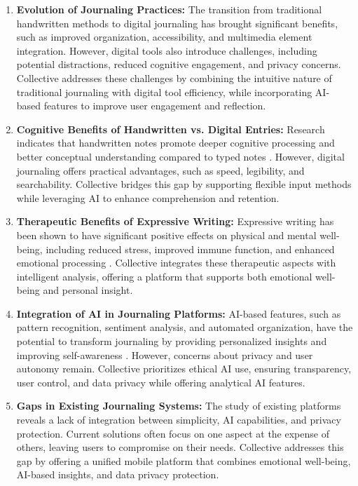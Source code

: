 \begin{enumerate}
	\item \textbf{Evolution of Journaling Practices:} The transition from traditional handwritten methods to digital journaling has brought significant benefits, such as improved organization, accessibility, and multimedia element integration. However, digital tools also introduce challenges, including potential distractions, reduced cognitive engagement, and privacy concerns. Collective addresses these challenges by combining the intuitive nature of traditional journaling with digital tool efficiency, while incorporating AI-based features to improve user engagement and reflection.
	
	\item \textbf{Cognitive Benefits of Handwritten vs. Digital Entries:} Research indicates that handwritten notes promote deeper cognitive processing and better conceptual understanding compared to typed notes \cite{mueller2014pen}. However, digital journaling offers practical advantages, such as speed, legibility, and searchability. Collective bridges this gap by supporting flexible input methods while leveraging AI to enhance comprehension and retention.
	
	\item \textbf{Therapeutic Benefits of Expressive Writing:} Expressive writing has been shown to have significant positive effects on physical and mental well-being, including reduced stress, improved immune function, and enhanced emotional processing \cite{pennebaker1999forming}. Collective integrates these therapeutic aspects with intelligent analysis, offering a platform that supports both emotional well-being and personal insight.
	
	\item \textbf{Integration of AI in Journaling Platforms:} AI-based features, such as pattern recognition, sentiment analysis, and automated organization, have the potential to transform journaling by providing personalized insights and improving self-awareness \cite{allahyari2017text}. However, concerns about privacy and user autonomy remain. Collective prioritizes ethical AI use, ensuring transparency, user control, and data privacy while offering analytical AI features.
	
	\item \textbf{Gaps in Existing Journaling Systems:} The study of existing platforms reveals a lack of integration between simplicity, AI capabilities, and privacy protection. Current solutions often focus on one aspect at the expense of others, leaving users to compromise on their needs. Collective addresses this gap by offering a unified mobile platform that combines emotional well-being, AI-based insights, and data privacy protection.
\end{enumerate}

